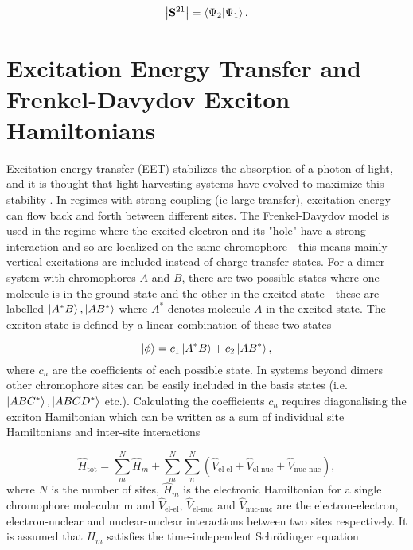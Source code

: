 \begin{equation}
\left\lvert {\mathbf{S}^{21}} \right\rvert = \braket{\Psi_2|\Psi_1}.
\end{equation}
%

\section{Excitation Energy Transfer and Frenkel-Davydov Exciton Hamiltonians}
\label{sec:frenkel_exciton_theory}

Excitation energy transfer (EET) stabilizes the absorption of a photon of light,
and it is thought that light harvesting systems have evolved to maximize this stability \cite{Cleary2013}.
In regimes with strong coupling (ie large transfer), excitation energy can flow back
and forth between different sites. The Frenkel-Davydov model \cite{Frenkel1931, Davydov1964}
is used in the regime where the excited electron and its "hole" have a strong interaction
and so are localized on the same chromophore - this means mainly vertical excitations
are included instead of charge transfer states. 
For a dimer system with chromophores $A$ and $B$, there are two possible states 
where one molecule is in the ground state and the other in the excited state - these 
are labelled $\ket{A^*B}, \ket{AB^*}$ where $A^*$ denotes molecule $A$ in the excited
state. The exciton state is defined by a linear combination of these two states

\begin{equation}
\ket{\phi} = c_1 \ket{A^*B} + c_2 \ket{AB^*},
\end{equation}
%
where $c_n$ are the coefficients of each possible state. In systems beyond dimers 
other chromophore sites can be easily included in the basis states (i.e. $\ket{ABC^*}, 
\ket{ABCD^*}$ etc.). Calculating the coefficients $c_n$ requires diagonalising the
exciton Hamiltonian which can be written as a sum of individual site Hamiltonians 
and inter-site interactions

\begin{equation}
\hat{H}_{\text{tot}} = \sum^N_m \hat{H}_m + \sum^N_m \sum^N_n \left(\hat{V}_{\text{el-el}} + \hat{V}_{\text{el-nuc}} + \hat{V}_{\text{nuc-nuc}}\right),
\end{equation}
%
where $N$ is the number of sites, $\hat{H}_m$ is the electronic Hamiltonian for 
a single chromophore molecular m and $\hat{V}_{\text{el-el}}$, $\hat{V}_{\text{el-nuc}}$ 
and $\hat{V}_{\text{nuc-nuc}}$ are the electron-electron, electron-nuclear and nuclear-nuclear
interactions between two sites respectively. It is assumed that $H_m$ satisfies
the time-independent Schrödinger equation

